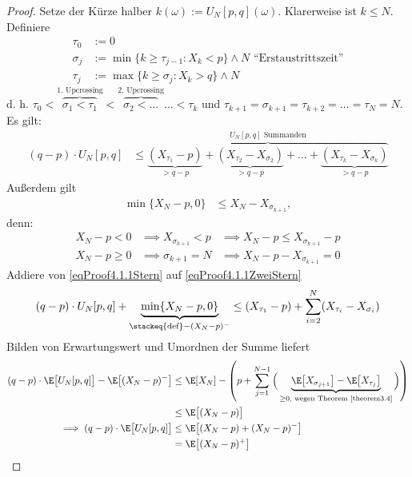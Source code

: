 \begin{proof}
Setze der Kürze halber $k(\omega):=U_N[p,q](\omega)$. Klarerweise ist $k\leq N$. Definiere
\begin{align*}
\tau_0&:=0\\
\sigma_j&:=\min\big\lbrace k\geq \tau_{j-1}:X_k<p\big\rbrace\wedge N\text{ ``Erstaustrittszeit''}\\
\tau_j&:=\max\big\lbrace k\geq\sigma_j:X_k>q\big\rbrace\wedge N
\end{align*}
d. h. $\tau_0<\overbrace{\sigma_1<\tau_1}^{\text{1. Upcrossing}}<\overbrace{\sigma_2<\ldots}^{\text{2. Upcrossing}}\ldots<\tau_k$ und $\tau_{k+1}=\sigma_{k+1}=\tau_{k+2}=\ldots=\tau_N=N$. Es gilt:
\begin{align}\label{eqProof4.1.1Stern}\tag{$\ast$}
(q-p)\cdot U_N[p,q] &\leq
\overbrace{\underbrace{(X_{\tau_1}-p)}_{>q-p}+\underbrace{(X_{\tau_2}-X_{\sigma_2})}_{>q-p}+\ldots+\underbrace{(X_{\tau_k}-X_{\sigma_k})}_{>q-p}}^{U_N[p,q]\text{ Summanden}}
\end{align}
Außerdem gilt
\begin{align}\label{eqProof4.1.1ZweiStern}\tag{$\ast\ast$}
\min\lbrace X_N-p,0\rbrace&\leq X_N-X_{\sigma_{k+1}},
\end{align}
denn: 
\begin{align*}
X_N-p<0&\implies X_{\sigma_{k+1}}<p&\implies X_N-p\leq X_{\sigma_{k+1}}-p\\
X_N-p\geq0&\implies \sigma_{k+1}=N&\implies X_N-p- X_{\sigma_{k+1}}=0
\end{align*}
Addiere von \eqref{eqProof4.1.1Stern} auf \eqref{eqProof4.1.1ZweiStern}
\begin{align*}
	(q-p)\cdot U_N[p,q]+\underbrace{\min\lbrace X_N-p,0\rbrace}_{\stackeq{\text{def}}-(X_N-p)^-}\leq (X_{\tau_1}-p) + \sum_{i=2}^N (X_{\tau_i} - X_{\sigma_i})
\end{align*}
Bilden von Erwartungswert und Umordnen der Summe liefert
\begin{align*}
(q-p)\cdot\E\big[U_N[p,q]\big]-\E\big[(X_N-p)^-\big]
&\leq\E[X_N]-\left(p+\sum\limits_{j=1}^{N-1}\Big(\underbrace{\E\big[X_{\sigma_{j+1}}\big]-\E\big[X_{\tau_j}\big]}_{\geq 0\text{, wegen Theorem \ref{theorem3.4}}}\Big)\right)\\
&\leq\E\big[(X_N-p)\big]\\
\implies
(q-p)\cdot\E\big[U_N[p,q]\big]&\leq\E\big[(X_N-p)+(X_N-p)^-\big]\\
&=\E\big[(X_N-p)^+\big]
\end{align*}
\end{proof}

